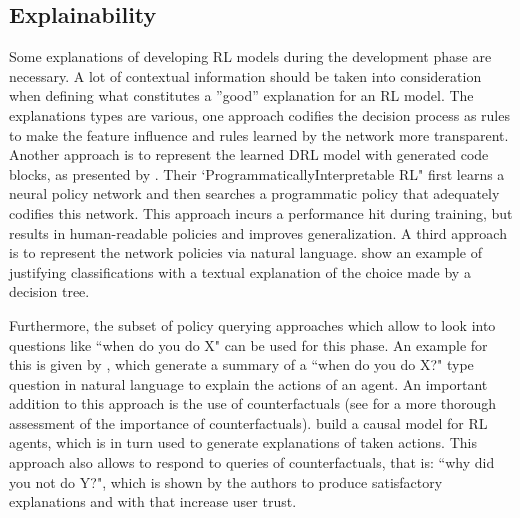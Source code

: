 \documentclass[twoside,11pt]{article}
\begin{document}
\subsection{Explainability}
Some explanations of developing RL models during the development phase are necessary. A lot of contextual information should be taken into consideration when defining what constitutes a ”good” explanation for an RL model. The explanations types are various, one approach \citet{LiuEtAl:2018:LinearModelUTrees} codifies the decision process as rules to make the feature influence and rules learned by the network more transparent. Another approach is to represent the learned DRL model with generated code blocks, as presented by \citet{VermaEtAl:2018:ProgrammaticallyInterpretableRL}. Their `ProgrammaticallyInterpretable RL" first learns a neural policy network and then searches a programmatic policy that adequately codifies this network. This approach incurs a performance hit during training, but results in human-readable policies and improves generalization.  A third approach is to represent the network policies via natural language. \citet{AlonsoEtAl:2018:xAINLBeerClassifier} show an example of justifying classifications with a textual explanation of the choice made by a decision tree.



Furthermore, the subset of policy querying approaches which allow to look into questions like ``when do you do X" can be used for this phase.
An example for this is given by \citet{HayesShah:2017:AutonomousPolicyExplanation}, which generate a summary of a ``when do you do X?" type question in natural language to explain the actions of an agent. An important addition to this approach is the use of counterfactuals (see \citet{EvansEtAl:2021:ExplainabilityParadox} for a more thorough assessment of the importance of counterfactuals). \citet{MadumalEtAl:2020:CausalRLCFs} build a causal model for RL agents, which is in turn used to generate explanations of taken actions. This approach also allows to respond to queries of counterfactuals, that is: ``why did you not do Y?", which is shown by the authors to produce satisfactory explanations and with that increase user trust.
\end{document}

